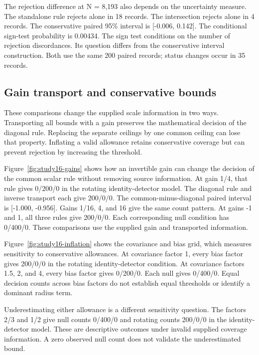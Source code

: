 The rejection difference at N = 8,193 also depends on the uncertainty measure. The standalone rule rejects alone in 18 records. The intersection rejects alone in 4 records. The conservative paired 95\% interval is [-0.006, 0.142]. The conditional sign-test probability is 0.00434. The sign test conditions on the number of rejection discordances. Its question differs from the conservative interval construction. Both use the same 200 paired records; status changes occur in 35 records.

\subsection{Gain transport and conservative bounds}

These comparisons change the supplied scale information in two ways. Transporting all bounds with a gain preserves the mathematical decision of the diagonal rule. Replacing the separate ceilings by one common ceiling can lose that property. Inflating a valid allowance retains conservative coverage but can prevent rejection by increasing the threshold.

Figure~\ref{fig:study16-gains} shows how an invertible gain can change the decision of the common scalar rule without removing source information. At gain 1/4, that rule gives 0/200/0 in the rotating identity-detector model. The diagonal rule and inverse transport each give 200/0/0. The common-minus-diagonal paired interval is [-1.000, -0.956]. Gains 1/16, 4, and 16 give the same count pattern. At gains -1 and 1, all three rules give 200/0/0. Each corresponding null condition has 0/400/0. These comparisons use the supplied gain and transported information.

Figure~\ref{fig:study16-inflation} shows the covariance and bias grid, which measures sensitivity to conservative allowances. At covariance factor 1, every bias factor gives 200/0/0 in the rotating identity-detector condition. At covariance factors 1.5, 2, and 4, every bias factor gives 0/200/0. Each null gives 0/400/0. Equal decision counts across bias factors do not establish equal thresholds or identify a dominant radius term.

Underestimating either allowance is a different sensitivity question. The factors 2/3 and 1/2 give null counts 0/400/0 and rotating counts 200/0/0 in the identity-detector model. These are descriptive outcomes under invalid supplied coverage information. A zero observed null count does not validate the underestimated bound.


